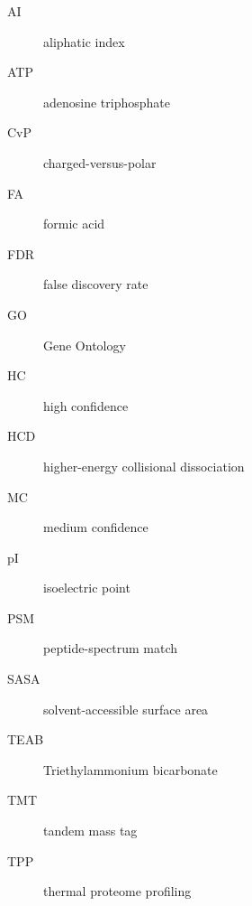 \begin{description}

    \item[AI] aliphatic index

    \item[ATP] adenosine triphosphate

    \item[CvP] charged-versus-polar

    \item[FA] formic acid

    \item[FDR] false discovery rate

    \item[GO] Gene Ontology

    \item[HC] high confidence

    \item[HCD] higher-energy collisional dissociation

    \item[MC] medium confidence

    \item[pI] isoelectric point

    \item[PSM] peptide-spectrum match

    \item[SASA] solvent-accessible surface area

    \item[TEAB] Triethylammonium bicarbonate

    \item[TMT] tandem mass tag

    \item[TPP] thermal proteome profiling

\end{description}
